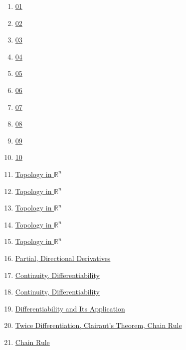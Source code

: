 \documentclass[11pt]{article}
\begin{document}
\begin{enumerate}
	\item	\href{https://mp.weixin.qq.com/s/2TNACvOuH_46R7gX4Mn6dg}{01}	%
	\item	\href{https://mp.weixin.qq.com/s/Sgj44XDOf9zAom5I6ozs-w}{02}	%
	\item	\href{https://mp.weixin.qq.com/s/TUkTY7x59gQKqt40DkA8Rg}{03} 	%
	\item 	\href{https://mp.weixin.qq.com/s/XDGUmbUnEe4WPVC_Rakw-Q}{04}	%
	\item 	\href{https://mp.weixin.qq.com/s/84SfjeawsTMy_nSVxemoRg}{05}	%
	\item 	\href{https://mp.weixin.qq.com/s/G4kogKqvUyk6VvYjDRW0lw}{06}	%
	\item 	\href{https://mp.weixin.qq.com/s/ILkCxucfpeReCLNyBZvC9A}{07}	%
	\item 	\href{https://mp.weixin.qq.com/s/inMf-nVR_21IfQ9t9-2eEw}{08}	%
	\item 	\href{https://mp.weixin.qq.com/s/DkyLOwbOfLLx9rntYScD2w}{09}	%
	\item 	\href{https://mp.weixin.qq.com/s/OG7fMCKFW9JxmyC4mjHzMQ}{10}	%
	\item	\href{https://mp.weixin.qq.com/s/pPjxEi3TWfZxE3BTNSCANg}{Topology in $\mathbb{R}^n$}	%
	\item	\href{https://mp.weixin.qq.com/s/xIzyZJnENWNc7vTPcVPj-A}{Topology in $\mathbb{R}^n$}	%
	\item	\href{https://mp.weixin.qq.com/s/ZLFegl9dvrsHq5mlQMb5MQ}{Topology in $\mathbb{R}^n$} 	%
	\item 	\href{https://mp.weixin.qq.com/s/987pIfPOZv2epHJxQJOqOw}{Topology in $\mathbb{R}^n$}	%
	\item 	\href{https://mp.weixin.qq.com/s/Q5ZAqX_fJtI9b6H_SoLbwQ}{Topology in $\mathbb{R}^n$}	%
	\item 	\href{https://mp.weixin.qq.com/s/U3vdkjRLU0gkvpzC2a3VIQ}{Partial, Directional Derivatives}	%
	\item 	\href{https://mp.weixin.qq.com/s/C2RmZ909e2eVHgplv8kYww}{Continuity, Differentiability}	%
	\item 	\href{https://mp.weixin.qq.com/s/CO24auIOHVvy8POC1rWWgA}{Continuity, Differentiability}	%
	\item 	\href{https://mp.weixin.qq.com/s/ZnHupbOzhmIATIDaVO8HqA}{Differentiability and Its Application}	%
	\item 	\href{https://mp.weixin.qq.com/s/BKmnghcPRlym3ejwB5YR7Q}{Twice Differentiation, Clairaut's Theorem, Chain Rule}	%
	\item	\href{https://mp.weixin.qq.com/s/vG3s02qdRAn-OSw0vQjwIw}{Chain Rule}	%

\end{enumerate}
\end{document}
